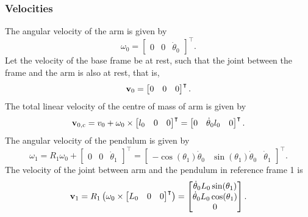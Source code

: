 \subsubsection{Velocities}
The angular velocity of the arm is given by
\begin{equation}
	\omega_0 = 	\begin{bmatrix}
					0 & 0 & \dot{\theta}_0
				\end{bmatrix}^\intercal.
\end{equation}
Let the velocity of the base frame be at rest, such that the joint
between the frame and the arm is also at rest, that is,
\begin{equation}
	\text{\textbf{v}}_0 = 	\begin{bmatrix}
					0 & 0 & 0
			\end{bmatrix}^\intercal.
\end{equation}
The total linear velocity of the centre of mass of arm is
given by
\begin{equation}
	\text{\textbf{v}}_{0, \text{c}} = v_0+\omega_0\times\begin{bmatrix}
					l_0 & 0 & 0
				\end{bmatrix}^\intercal = \begin{bmatrix}
				0 & \dot{\theta}_0l_0 & 0
				\end{bmatrix}^\intercal.
\end{equation}
The angular velocity of the pendulum is given by
\begin{equation}
\omega_1 = R_1\omega_0 + \begin{bmatrix}
				0 & 0 & \dot{\theta}_1
			\end{bmatrix}^\intercal = 
			\begin{bmatrix}
				-\cos(\theta_1)\dot{\theta}_0 & \sin(\theta_1)\dot{\theta}_0 & \dot{\theta}_1
			\end{bmatrix}^\intercal.
\end{equation}
The velocity of the joint between arm and the pendulum in
reference frame 1 is
\begin{equation}
	\text{\textbf{v}}_{1} = R_1\left( \omega_0\times	\begin{bmatrix}
									L_0 & 0 & 0
									\end{bmatrix}^\intercal \right) = 
	\begin{bmatrix}
		\dot{\theta}_0L_0\sin(\theta_1)\\
		\dot{\theta}_0L_0\cos(\theta_1)\\
		0
	\end{bmatrix}.
\end{equation}
